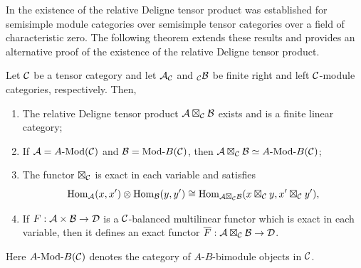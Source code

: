 \documentclass{amsart}
\begin{document}
In \cite{0909.3140} the existence of the relative Deligne tensor product was established for semisimple module categories over semisimple tensor categories over a field of characteristic zero. The following theorem extends these results and provides an alternative proof of the existence of the relative Deligne tensor product.   

\begin{maintheorem} \label{thm:DelignePrdtOverATCExists}
	Let $\mathcal C$ be a tensor category and let $\mathcal A_{\mathcal C}$ and ${}_{\mathcal C}\mathcal B$ be finite right and left $\mathcal C$-module categories, respectively. Then,
	\begin{enumerate}
		\item The relative Deligne tensor product $\mathcal A \boxtimes_{\mathcal C} \mathcal B$ exists and is a finite linear category;
		\item If $\cA = \Mod{A}{}(\cC)$ and $\cB = \Mod{}{B}(\cC)$, then $\cA \boxtimes_{\cC} \cB \simeq \Mod{A }{B}(\cC)$;

		\item The functor $\boxtimes_{\mathcal C}$ is exact in each variable and satisfies 
		\begin{equation*}
			\operatorname{Hom}_{\mathcal A}(x,x') \otimes \operatorname{Hom}_{\mathcal B}(y, y') \cong \operatorname{Hom}_{\mathcal A \boxtimes_{\mathcal C} \mathcal B} (x \boxtimes_{\mathcal C} y, x' \boxtimes_{\mathcal C} y'),
		\end{equation*}
		\item If $F: \mathcal A \times \mathcal B \to \mathcal D$ is a $\mathcal C$-balanced multilinear functor which is exact in each variable, then it defines an exact functor $\overline{F}: \mathcal A \boxtimes_{\mathcal C} \mathcal B \to \mathcal D$. 
	\end{enumerate} 
\nid Here $\Mod{A}{B}(\cC)$ denotes the category of $A$-$B$-bimodule objects in $\mathcal C$.	
\end{maintheorem}
\end{document}
